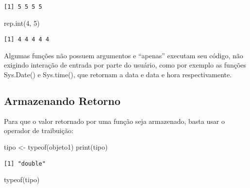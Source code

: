 \documentclass[
  letterpaper,
  DIV=11,
  numbers=noendperiod]{scrreprt}
\newenvironment{Shaded}{\begin{snugshade}}{\end{snugshade}}
\newcommand{\DecValTok}[1]{\textcolor[rgb]{0.68,0.00,0.00}{#1}}
\newcommand{\FunctionTok}[1]{\textcolor[rgb]{0.28,0.35,0.67}{#1}}
\newcommand{\NormalTok}[1]{\textcolor[rgb]{0.00,0.23,0.31}{#1}}
\newcommand{\OtherTok}[1]{\textcolor[rgb]{0.00,0.23,0.31}{#1}}
\begin{document}
\begin{verbatim}
[1] 5 5 5 5
\end{verbatim}

\begin{Shaded}
\begin{Highlighting}[]
\FunctionTok{rep.int}\NormalTok{(}\DecValTok{4}\NormalTok{, }\DecValTok{5}\NormalTok{)}
\end{Highlighting}
\end{Shaded}

\begin{verbatim}
[1] 4 4 4 4 4
\end{verbatim}

\begin{tcolorbox}[enhanced jigsaw, bottomtitle=1mm, colframe=quarto-callout-note-color-frame, coltitle=black, left=2mm, opacitybacktitle=0.6, opacityback=0, breakable, arc=.35mm, titlerule=0mm, title=\textcolor{quarto-callout-note-color}{\faInfo}\hspace{0.5em}{Nota}, colbacktitle=quarto-callout-note-color!10!white, toptitle=1mm, leftrule=.75mm, bottomrule=.15mm, toprule=.15mm, colback=white, rightrule=.15mm]

Algumas funções não possuem argumentos e ``apenas'' executam seu código,
não exigindo interação de entrada por parte do usuário, como por exemplo
as funções Sys.Date() e Sys.time(), que retornam a data e data e hora
respectivamente.

\end{tcolorbox}

\hypertarget{armazenando-retorno}{%
\subsection{Armazenando Retorno}\label{armazenando-retorno}}

Para que o valor retornado por uma função seja armazenado, basta usar o
operador de traibuição:

\begin{Shaded}
\begin{Highlighting}[]
\NormalTok{tipo }\OtherTok{\textless{}{-}} \FunctionTok{typeof}\NormalTok{(objeto1)}
\FunctionTok{print}\NormalTok{(tipo)}
\end{Highlighting}
\end{Shaded}

\begin{verbatim}
[1] "double"
\end{verbatim}

\begin{Shaded}
\begin{Highlighting}[]
\FunctionTok{typeof}\NormalTok{(tipo)}
\end{Highlighting}
\end{Shaded}
\end{document}
